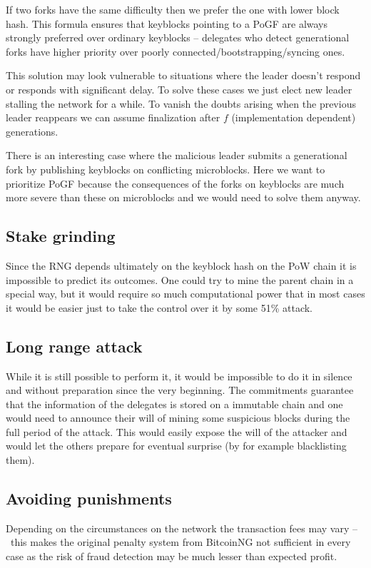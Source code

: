 If two forks have the same difficulty then we prefer the one with lower
block hash. This formula ensures that keyblocks pointing to a PoGF are always
strongly preferred over ordinary keyblocks – delegates who detect generational
forks have higher priority over poorly connected/bootstrapping/syncing ones.

This solution may look vulnerable to situations where the leader doesn't respond
or responds with significant delay. To solve these cases we just elect new
leader stalling the network for a while. To vanish the doubts arising when the
previous leader reappears we can assume
finalization after $f$ (implementation dependent) generations.

There is an interesting case where the malicious leader submits a generational
fork by publishing keyblocks on conflicting microblocks.
Here we want to prioritize PoGF because the consequences of the forks on
keyblocks are much more severe than these on microblocks and we would need to
solve them anyway.

\subsection{Stake grinding}

Since the RNG depends ultimately on the keyblock hash on the PoW chain it is
impossible to predict its outcomes. One could try to mine the parent chain
in a special way, but it would require so much computational power that in
most cases it would be easier just to take the control over it by some 51\%
attack.

\subsection{Long range attack}
While it is still possible to perform it, it would be impossible to do it in
silence and without preparation since the very beginning. The commitments
guarantee that the information of the delegates is stored on a immutable chain
and one would need to announce their will of mining some suspicious blocks during
the full period of the attack. This would easily expose the will of the attacker
and would let the others prepare for eventual surprise (by for example
blacklisting them).

\subsection{Avoiding punishments}
Depending on the circumstances on the network the transaction fees may vary
– this makes the original penalty system from BitcoinNG not sufficient in every
case as the risk of fraud detection may be much lesser than expected profit.

